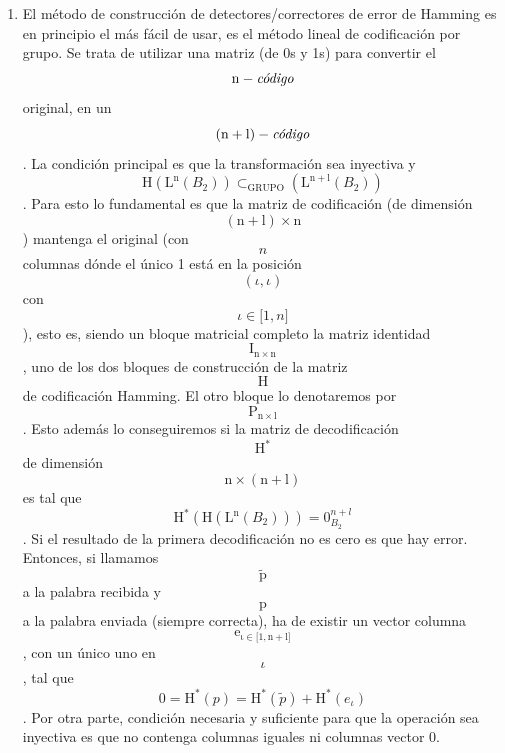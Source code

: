 \begin{enumerate}
\begin{enumerate}
\begin{enumerate}
\begin{enumerate}
        Luego la corrección será
        \[\mathtt{\mathrm{\widetilde{p}}}\rightarrow\mathtt{\mathrm{p^{i}}}\]necesariamente.
        Siempre habrá una sola pala\-bra de nuestro código que esté a
        distancia menor o igual que \[p\], estando las de\-más palabras
        del código a distancia mayor o igual que \[p + 1\].
      \item
        El método de construcción de detectores/correctores de error de
        Hamming es en principio el más fácil de usar, es el método
        lineal de codificación por grupo. Se trata de utilizar una
        matriz (de 0s y 1s) para convertir el
        \[\mathtt{\mathrm{n}} - \text{\textit{código}}\] original, en
        un\[\left( \mathtt{\mathrm{n + l}} \right) - \text{\textit{código}}\].
        La condición principal es que la transformación sea inyecti\-va
        y\[\mathtt{\mathrm{H}}\left( {\mathtt{\mathrm{L}}^{\mathtt{\mathrm{n}}}\left( B_{2} \right)} \right) \subset_{\text{GRUPO}}\left( {\mathtt{\mathrm{L}}^{\mathtt{\mathrm{n + l}}}\left( B_{2} \right)} \right)\].
        Para esto lo fundamental es que la matriz de codificación (de
        dimensión
        \[\left( \mathtt{\mathrm{n + l}} \right) \times \mathtt{\mathrm{n}}\])
        mantenga el original (con \[n\] colum\-nas dónde el único 1 está
        en la posición
        \[\left( {\iota,\iota} \right)\]con\[\iota \in {\lbrack{1,n}\rbrack}\]),
        esto es, siendo un bloque matricial completo la matriz
        identidad\[\mathtt{\mathrm{I_{n \times n}}}\], uno de los dos
        bloques de construcción de la matriz\[\mathtt{\mathrm{H}}\]de
        codificación Hamming. El otro bloque lo de\-notaremos por
        \[\mathtt{\mathrm{P_{n \times l}}}\]. Esto además lo
        conseguiremos si la matriz de decodifica\-ción
        \[\mathtt{\mathrm{H}}^{\mathbf{\mathrm{\ast}}}\]de dimensión
        \[\mathtt{\mathrm{n \times \left( {n + l} \right)}}\]es tal que
        \[\mathtt{\mathrm{H^{\mathbf{\mathrm{\ast}}}}}{\left( {\mathtt{\mathrm{H}}\left( {\mathtt{\mathrm{L}}^{\mathtt{\mathrm{n}}}\left( B_{2} \right)} \right)} \right) = 0_{B_{2}}^{n + l}}\].
        Si el resultado de la primera decodificación no es cero es que
        hay error. Entonces, si llamamos
        \[\widetilde{\mathtt{\mathrm{p}}}\]a la palabra recibida y
        \[\mathtt{\mathrm{p}}\]a la palabra enviada (siempre correcta),
        ha de existir un vector columna
        \[\mathtt{\mathrm{e_{\iota \in {\lbrack{1,{n + l}}\rbrack}}}}\],
        con un único uno en \[\iota\], tal que
        \[{0 = \mathtt{\mathrm{H^{\mathbf{\mathrm{\text{*}}}}}}}{(p) = \mathtt{\mathrm{H^{\mathbf{\mathrm{\text{*}}}}}}}{\left( \widetilde{p} \right) + {\mathtt{\mathrm{H^{\mathbf{\mathrm{\text{*}}}}}}\left( e_{\iota} \right)}}\].
        Por otra parte, condición necesaria y sufi\-ciente para que la
        operación sea inyectiva es que no contenga columnas igua\-les ni
        columnas vector 0.


\end{enumerate}
\end{enumerate}
\end{enumerate}
\end{enumerate}
